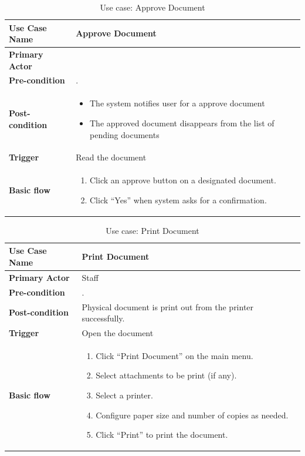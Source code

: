 \begin{table}
	\caption{Use case: Approve Document}
	\begin{tabular}{|l|L{9cm}|}
		\hline
		\textbf{Use Case Name} & Approve Document \\
		\hline
		
		\textbf{Primary Actor} & \allICPersonel \\
		\textbf{Pre-condition} & \alreadylogin. \\
		\textbf{Post-condition} & 
		\begin{itemize}
			\item The system notifies user for a approve document
			\item The approved document disappears from the list of pending documents
		\end{itemize} \\
		\textbf{Trigger} & Read the document \\
		\textbf{Basic flow} & 
		\begin{enumerate}
			\item Click an approve button on a designated document.
			\item Click \enquote{Yes} when system asks for a confirmation.
		\end{enumerate} \\
		\hline
	\end{tabular}
\end{table}

\begin{table}
	\centering
	\caption{Use case: Print Document}
	\begin{tabular}{|l|L{9cm}|}
		\hline
		\textbf{Use Case Name} & Print Document \\
		\hline
		
		\textbf{Primary Actor} & Staff \\
		\textbf{Pre-condition} & \alreadylogin. \\
		\textbf{Post-condition} & Physical document is print out from the printer successfully. \\
		\textbf{Trigger} & Open the document \\
		\textbf{Basic flow} & 
		\begin{enumerate}
			\item Click \enquote{Print Document} on the main menu.
			\item Select attachments to be print (if any).
			\item Select a printer.
			\item Configure paper size and number of copies as needed.
			\item Click \enquote{Print} to print the document.
		\end{enumerate} \\
		\hline
	\end{tabular}
\end{table}

